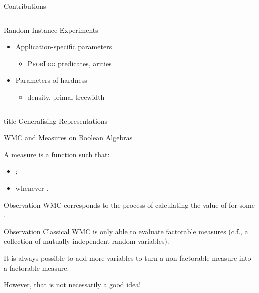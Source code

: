 \documentclass{beamer}
\begin{document}
\begin{frame}{Contributions}
\begin{columns}[t]
\begin{column}{0.54\textwidth}
      \begin{block}{Random-Instance Experiments}
        \begin{itemize}
          \item Application-specific parameters%
          \begin{itemize}
            \item \textsc{ProbLog} predicates, arities
          \end{itemize}
          \item Parameters of hardness
          \begin{itemize}
            \item density, primal treewidth
          \end{itemize}
        \end{itemize}
      \end{block}
    \end{column}
  \end{columns}
\end{frame}

\begin{frame}
  \vfill
  \centering
  \begin{beamercolorbox}[sep=8pt,center,shadow=true,rounded=true]{title}
    Generalising Representations\par%
  \end{beamercolorbox}
  \vfill
\end{frame}

\begin{frame}{WMC and Measures on Boolean Algebras}
  \begin{definition}
    A \alert{measure} is a function
    such that:
    \begin{itemize}
      \item {};
      \item {} whenever
            .
    \end{itemize}
  \end{definition}
  \begin{block}{Observation}
    WMC corresponds to the process of calculating the value of
     for some
    .
  \end{block}
  \begin{block}{Observation}
    Classical WMC is only able to evaluate \alert{factorable} measures (c.f., a
    collection of mutually independent random variables).
  \end{block}
  \begin{theorem}
    It is always possible to add more variables to turn a non-factorable measure
    into a factorable measure.
  \end{theorem}
  However, that is not necessarily a good idea!
\end{frame}
\end{document}
